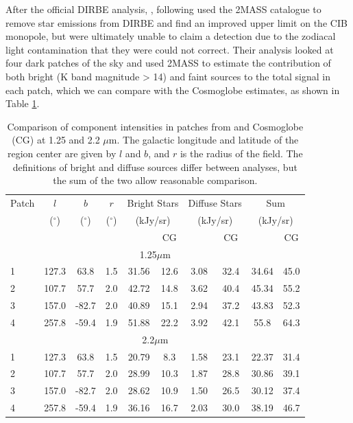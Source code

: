 \documentclass{aa}
\begin{document}
After the official DIRBE analysis, \cite{DIRBE2mass}, following \cite{gorjian} used the 2MASS catalogue to remove star emissions from DIRBE and find an improved upper limit on the CIB monopole, but were ultimately unable to claim a detection due to the zodiacal light contamination that they were could not correct. Their analysis looked at four dark patches of the sky and used 2MASS to estimate the contribution of both bright (K band magnitude > 14) and faint sources to the total signal in each patch, which we can compare with the Cosmoglobe estimates, as shown in Table \ref{tab:2mass}.

\begin{table}
    \centering
    \begin{tabular}{l c c c c c c c c c}
    \hline
    \hline
     Patch & $l$ & $b$ & $r$ & \multicolumn{2}{c}{Bright Stars} & \multicolumn{2}{c}{Diffuse Stars} & \multicolumn{2}{c}{Sum}\\ 
     & ($^{\circ}$) & ($^{\circ}$) & ($^{\circ}$) & \multicolumn{2}{c}{(kJy/sr)} & \multicolumn{2}{c}{(kJy/sr)} & \multicolumn{2}{c}{(kJy/sr)}\\
          &  & & & \cite{DIRBE2mass} & CG & \cite{DIRBE2mass} & CG  & \cite{DIRBE2mass} & CG\\
    \hline
    \hline
    \multicolumn{10}{c}{1.25$\mu$m}\\
    \hline
     1 \rule{0pt}{2ex} & 127.3 & 63.8 & 1.5 & 31.56 & 12.6 & 3.08 & 32.4 & 34.64 & 45.0\\
     2 & 107.7 & 57.7 & 2.0 & 42.72 & 14.8 & 3.62 & 40.4 & 45.34 & 55.2\\
     3 & 157.0 & -82.7 & 2.0 & 40.89 & 15.1 & 2.94 & 37.2 & 43.83 & 52.3\\
     4 & 257.8 & -59.4 & 1.9 & 51.88 & 22.2 & 3.92 & 42.1 & 55.8 & 64.3\\
     \hline
     \hline
     \multicolumn{10}{c}{2.2$\mu$m}\\
     \hline
     1 \rule{0pt}{2ex} & 127.3 & 63.8  & 1.5 & 20.79 & 8.3 & 1.58 & 23.1 & 22.37 & 31.4\\
     2 & 107.7 & 57.7 & 2.0 & 28.99 & 10.3 & 1.87 & 28.8 & 30.86 & 39.1\\
     3 & 157.0 & -82.7 & 2.0 & 28.62 & 10.9 & 1.50 & 26.5 & 30.12 & 37.4\\
     4 & 257.8 & -59.4 & 1.9 & 36.16 & 16.7 & 2.03 & 30.0 & 38.19 & 46.7\\
     \hline
    \end{tabular}
    \caption{Comparison of component intensities in patches from \cite{DIRBE2mass} and Cosmoglobe (CG) at 1.25 and 2.2 $\mu$m. The galactic longitude and latitude of the region center are given by $l$ and $b$, and $r$ is the radius of the field. The definitions of bright and diffuse sources differ between analyses, but the sum of the two allow reasonable comparison.}
    \label{tab:2mass}
\end{table}
\end{document}
